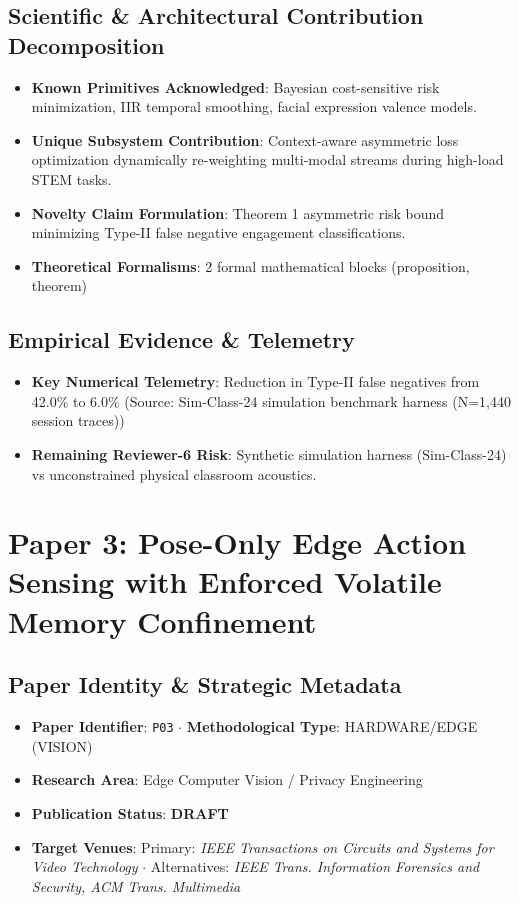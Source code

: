 \documentclass[11pt,a4paper]{article}
\begin{document}
\subsection*{Scientific & Architectural Contribution Decomposition}
\begin{itemize}[leftmargin=1.5em, itemsep=0.2em]
    \item \textbf{Known Primitives Acknowledged}: Bayesian cost-sensitive risk minimization, IIR temporal smoothing, facial expression valence models.
    \item \textbf{Unique Subsystem Contribution}: Context-aware asymmetric loss optimization dynamically re-weighting multi-modal streams during high-load STEM tasks.
    \item \textbf{Novelty Claim Formulation}: Theorem 1 asymmetric risk bound minimizing Type-II false negative engagement classifications.
    \item \textbf{Theoretical Formalisms}: 2 formal mathematical blocks (proposition, theorem)
\end{itemize}

\subsection*{Empirical Evidence & Telemetry}
\begin{itemize}[leftmargin=1.5em, itemsep=0.2em]
    \item \textbf{Key Numerical Telemetry}: Reduction in Type-II false negatives from 42.0\% to 6.0\% (Source: Sim-Class-24 simulation benchmark harness (N=1,440 session traces))
    \item \textbf{Remaining Reviewer-6 Risk}: Synthetic simulation harness (Sim-Class-24) vs unconstrained physical classroom acoustics.
\end{itemize}

\section{Paper 3: Pose-Only Edge Action Sensing with Enforced Volatile Memory Confinement}

\subsection*{Paper Identity \& Strategic Metadata}
\begin{itemize}[leftmargin=1.5em, itemsep=0.2em]
    \item \textbf{Paper Identifier}: \texttt{P03} $\cdot$ \textbf{Methodological Type}: HARDWARE/EDGE (VISION)
    \item \textbf{Research Area}: Edge Computer Vision / Privacy Engineering
    \item \textbf{Publication Status}: \textbf{DRAFT}
    \item \textbf{Target Venues}: Primary: \textit{IEEE Transactions on Circuits and Systems for Video Technology} $\cdot$ Alternatives: \textit{IEEE Trans. Information Forensics and Security, ACM Trans. Multimedia}
\end{itemize}
\end{document}
